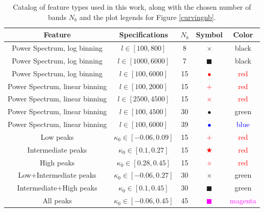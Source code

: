 \documentclass[reprint,aps,prd,superscriptaddress,showkeys,showpacs]{revtex4-1}
\begin{document}
\begin{table}
\begin{center}
\begin{tabular}{ccccc}
\toprule
\textbf{Feature} &  \textbf{Specifications} & $N_b$ &  \textbf{Symbol} & \textbf{Color} \\ \hline \hline
\midrule
Power Spectrum, log binning  & $l \in [100,800] $ & 8 & $\times$ & black  \\ 
Power Spectrum, log binning  & $l \in [1000,6000] $ & 7 & $\blacksquare$ & black  \\ 
Power Spectrum, log binning  & $l \in [100,6000] $ & 15 & \textcolor{red}{$\bullet$} & \textcolor{red}{red}  \\
Power Spectrum, linear binning  & $l \in [100,2000] $ & 15 & \textcolor{red}{$+$} & \textcolor{red}{red}  \\ 
Power Spectrum, linear binning  & $l \in [2500,4500] $ & 15 & \textcolor{red}{$\times$} & \textcolor{red}{red}  \\
Power Spectrum, linear binning  & $l \in [100,4500] $ & 30 & \textcolor{OliveGreen}{$\bullet$} & \textcolor{OliveGreen}{green}  \\ 
Power Spectrum, linear binning  & $l \in [100,6000] $ & 39 & \textcolor{blue}{$\bullet$} & \textcolor{blue}{blue}  \\ \hline
Low peaks  & $\kappa_0 \in [-0.06,0.09] $ & 15 & \textcolor{red}{$+$} & \textcolor{red}{red}  \\ 
Intermediate peaks  & $\kappa_0 \in [0.1,0.27] $ & 15 & \textcolor{red}{$\bigstar$} & \textcolor{red}{red}  \\ 
High peaks  & $\kappa_0 \in [0.28,0.45] $ & 15 & \textcolor{red}{$\diamond$} & \textcolor{red}{red}  \\
Low+Intermediate peaks  & $\kappa_0 \in [-0.06,0.27] $ & 30 & \textcolor{OliveGreen}{$\times$} & \textcolor{OliveGreen}{green}  \\
Intermediate+High peaks  & $\kappa_0 \in [0.1,0.45] $ & 30 & \textcolor{OliveGreen}{$\blacksquare$} & \textcolor{OliveGreen}{green}  \\
All peaks  & $\kappa_0 \in [-0.06,0.45] $ & 45 & \textcolor{magenta}{$\blacksquare$} & \textcolor{magenta}{magenta}  \\ \hline
\bottomrule
\end{tabular}
\end{center}
\caption{Catalog of feature types used in this work, along with the chosen number of bands $N_b$ and the plot legends for Figure \ref{curvingnb}.}
\label{featuretable}
\end{table}
\end{document}
